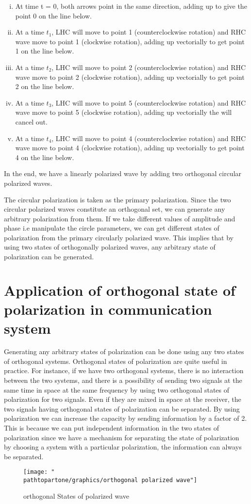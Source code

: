 \begin{enumerate}[(i)]
\item At time t = 0, both arrows point in the same direction, adding up to give the point 0 on the line below.
\item At a time $ t_{1} $, LHC will move to point 1 (counterclockwise rotation) and RHC wave move to point 1 (clockwise rotation), adding up vectorially to get point 1 on the line below.
\item At a time $ t_{2} $, LHC will move to point 2 (counterclockwise rotation) and RHC wave move to point 2 (clockwise rotation), adding up vectorially to get point 2 on the line below.
\item At a time $ t_{3} $, LHC will move to point 5 (counterclockwise rotation) and RHC wave move to point 5 (clockwise rotation), adding up vectorially the will cancel out.
\item At a time $ t_{4} $, LHC will move to point 4 (counterclockwise rotation) and RHC wave move to point 4 (clockwise rotation), adding up vectorially to get point 4 on the line below.
\end{enumerate}

In the end, we have a linearly polarized wave by adding two orthogonal circular polarized waves.

The circular polarization is taken as the primary polarization. Since the two circular polarized waves constitute an orthogonal set, we can generate any arbitrary polarization from them. If we take different values of amplitude and phase i.e manipulate the circle parameters, we can get different states of polarization from the primary circularly polarized wave. This implies that by using two states of orthogonally polarized waves, any arbitrary state of polarization can be generated.


\section{Application of orthogonal state of polarization in communication system}	
Generating any arbitrary states of polarization can be done using any two states of orthogonal systems. Orthogonal states of polarization are quite useful in practice. For instance, if we have two orthogonal systems, there is no interaction between the two systems, and there is a possibility of sending two signals at the same time in space at the same frequency by using two orthogonal states of polarization for two signals. Even if they are mixed in space at the receiver, the two signals having orthogonal states of polarization can be separated. By using polarization we can increase the capacity by sending information by a factor of 2. This is because we can put independent information in the two states of polarization since we have a mechanism for separating the state of polarization by choosing a system with a particular polarization, the information can always be separated.	
\begin{figure}[h]
\centering
\texttt{[image: "\\pathtopartone/graphics/orthogonal polarized wave"]}
\caption{orthogonal States of polarized wave}
\label{fig:orthogonal-polarized-wave}
\end{figure}


